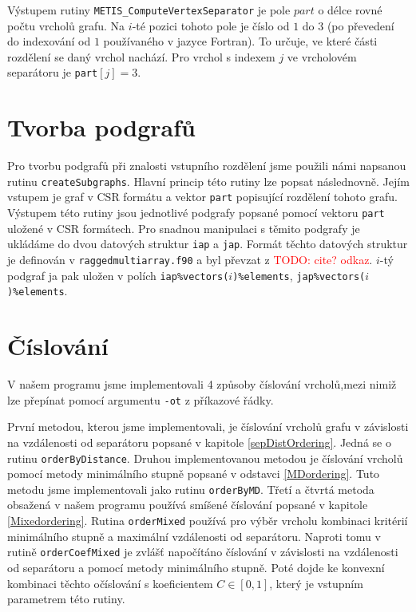 \documentclass[11pt,american,czech,oneside]{book}
\theoremstyle{plain}
\theoremstyle{definition}
\newcommand{\TODO}[1]{\textcolor{red}{TODO: #1}}
\begin{document}
Výstupem rutiny \texttt{METIS\_ComputeVertexSeparator} je pole $part$ o délce rovné počtu vrcholů grafu. Na $i$-té pozici tohoto pole je číslo od $1$ do $3$ (po převedení do indexování od $1$ používaného v jazyce Fortran). To určuje, ve které části rozdělení se daný vrchol nachází. Pro vrchol s indexem $j$ ve vrcholovém separátoru je \texttt{part}$[j] = 3$.

\section{Tvorba podgrafů}
Pro tvorbu podgrafů při znalosti vstupního rozdělení jsme použili námi napsanou rutinu \texttt{createSubgraphs}. Hlavní princip této rutiny lze popsat následnovně. Jejím vstupem je graf v CSR formátu a vektor \texttt{part} popisující rozdělení tohoto grafu. Výstupem této rutiny jsou jednotlivé podgrafy popsané pomocí vektoru \texttt{part} uložené v CSR formátech. Pro snadnou manipulaci s těmito podgrafy je ukládáme do dvou datových struktur \texttt{iap} a \texttt{jap}. Formát těchto datových struktur je definován v \texttt{raggedmultiarray.f90} a byl převzat z \TODO{cite? odkaz}. $i$-tý podgraf ja pak uložen v polích \texttt{iap\%vectors($i$)\%elements}, \texttt{jap\%vectors($i$)\%elements}.


\section{Číslování}
V našem programu jsme implementovali 4 způsoby číslování vrcholů,mezi nimiž lze přepínat pomocí argumentu \texttt{-ot} z příkazové řádky.

První metodou, kterou jsme implementovali, je číslování vrcholů grafu v závislosti na vzdálenosti od separátoru popsané v kapitole \ref{sepDistOrdering}. Jedná se o rutinu \texttt{orderByDistance}. Druhou implementovanou metodou je číslování vrcholů pomocí metody minimálního stupně popsané v odstavci \ref{MDordering}. Tuto metodu jsme implementovali jako rutinu \texttt{orderByMD}. Třetí a čtvrtá metoda obsažená v našem programu používá smíšené číslování popsané v kapitole \ref{Mixedordering}. Rutina \texttt{orderMixed} používá pro výběr vrcholu kombinaci kritérií minimálního stupně a maximální vzdálenosti od separátoru. Naproti tomu v rutině \texttt{orderCoefMixed} je zvlášť napočítáno číslování v závislosti na vzdálenosti od separátoru a pomocí metody minimálního stupně. Poté dojde ke konvexní kombinaci těchto očíslování s koeficientem $C \in [0,1]$, který je vstupním parametrem této rutiny.
\end{document}
